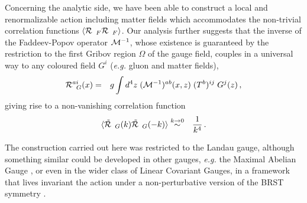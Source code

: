 Concerning the analytic side, we have been able to construct a local and renormalizable action
including matter fields which accommodates the non-trivial correlation functions $\langle{\cal
R}_{\;\;F}{\cal R}_{\;\;F}\rangle$. Our analysis further suggests that the inverse of the
Faddeev-Popov operator ${\cal M}^{-1}$, whose existence is guaranteed by the restriction to
the first Gribov region $\Omega$ of the gauge field, couples in a universal way to any coloured
field $G^i$ ({\it e.g.} gluon and matter fields),
\begin{eqnarray}
{\cal R}^{ai}_{\;\;G}(x)  &=&  g \int d^4z\;  ({\cal M}^{-1})^{ab} (x,z)   \;(T^b)^{ij}
\;G^{j}(z) \,,
 \label{RG}
\end{eqnarray}
giving rise to a non-vanishing correlation function 
\begin{eqnarray}
\langle \tilde {\cal R}_{\;\;G}(k)\tilde {\cal R}_{\;\;G}(-k)\rangle&\stackrel{k\to
0}{\sim}&\frac{1}{k^4} \,.
\label{RRG}
\end{eqnarray}

The construction carried out here was restricted to the Landau gauge, although something
similar could be developed in other gauges, \emph{e.g.} the Maximal Abelian Gauge
\cite{Capri:2015pxa}, or even in the wider class of Linear Covariant Gauges, in a framework that
lives invariant the action under a non-perturbative version of the BRST symmetry
\cite{Capri:2015ixa,Capri:2015nzw,Capri:2016aqq}.































